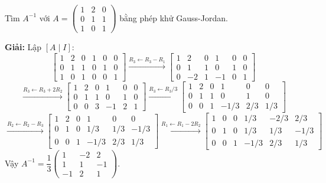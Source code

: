 \documentclass[12pt,a4paper]{article}
\begin{document}
\begin{vidu}
  Tìm $A^{-1}$ với $A = \begin{pmatrix}1 & 2 & 0 \\ 0 & 1 & 1 \\ 1 & 0 & 1\end{pmatrix}$ bằng phép khử Gauss-Jordan.

  \medskip\textbf{Giải:}
  Lập $[A \mid I]$:
  \[
    \left[\begin{array}{ccc|ccc} 1&2&0&1&0&0 \\ 0&1&1&0&1&0 \\ 1&0&1&0&0&1 \end{array}\right]
    \xrightarrow{R_3 \leftarrow R_3-R_1}
    \left[\begin{array}{ccc|ccc} 1&2&0&1&0&0 \\ 0&1&1&0&1&0 \\ 0&-2&1&-1&0&1 \end{array}\right]
  \]
  \[
    \xrightarrow{R_3 \leftarrow R_3+2R_2}
    \left[\begin{array}{ccc|ccc} 1&2&0&1&0&0 \\ 0&1&1&0&1&0 \\ 0&0&3&-1&2&1 \end{array}\right]
    \xrightarrow{R_3 \leftarrow R_3/3}
    \left[\begin{array}{ccc|ccc} 1&2&0&1&0&0 \\ 0&1&1&0&1&0 \\ 0&0&1&-1/3&2/3&1/3 \end{array}\right]
  \]
  \[
    \xrightarrow{R_2 \leftarrow R_2-R_3}
    \left[\begin{array}{ccc|ccc} 1&2&0&1&0&0 \\ 0&1&0&1/3&1/3&-1/3 \\ 0&0&1&-1/3&2/3&1/3 \end{array}\right]
    \xrightarrow{R_1 \leftarrow R_1-2R_2}
    \left[\begin{array}{ccc|ccc} 1&0&0&1/3&-2/3&2/3 \\ 0&1&0&1/3&1/3&-1/3 \\ 0&0&1&-1/3&2/3&1/3 \end{array}\right]
  \]
  Vậy $A^{-1} = \dfrac{1}{3}\begin{pmatrix}1&-2&2\\1&1&-1\\-1&2&1\end{pmatrix}$.
\end{vidu}

\end{document}
